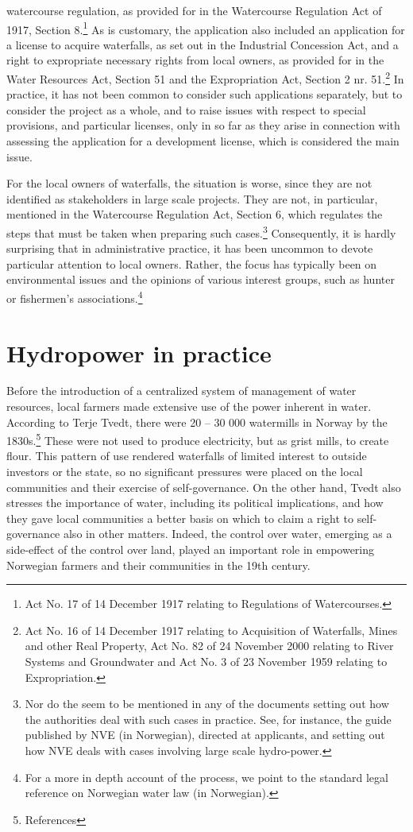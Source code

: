 watercourse regulation, as provided for in the Watercourse Regulation Act of 1917, Section 8.\footnote{Act No. 17 of 14 December 1917 relating to Regulations of Watercourses.} As is customary, the application also included an application for a license to acquire waterfalls, as set out in the Industrial Concession Act, and a right to expropriate necessary rights from local owners, as provided for in the Water Resources Act, Section 51 and the Expropriation Act, Section 2 nr. 51.\footnote{Act No. 16 of 14 December 1917 relating to Acquisition of Waterfalls, Mines and other Real Property, Act No. 82 of 24 November 2000 relating to River Systems and Groundwater and Act No. 3 of 23 November 1959 relating to Expropriation.} In practice, it has not been common to consider such applications separately, but to consider the project as a whole, and to raise issues with respect to special provisions, and particular licenses, only in so far as they arise in connection with assessing the application for a development license, which is considered the main issue.


For the local owners of waterfalls, the situation is worse, since they are not identified as stakeholders in large scale projects. They are not, in particular, mentioned in the Watercourse Regulation Act, Section 6, which regulates the steps that must be taken when preparing such cases.\footnote{Nor do the seem to be mentioned  in any of the documents setting out how the authorities deal with such cases in practice. See, for instance, the guide published by NVE \cite{rettleiar} (in Norwegian), directed at applicants, and setting out how NVE deals with cases involving large scale hydro-power.} Consequently, it is hardly surprising that in administrative practice, it has been uncommon to devote particular attention to local owners. Rather, the focus has typically been on environmental issues and the opinions of various interest groups, such as hunter or fishermen's associations.\footnote{For a more in depth account of the process, we point to the standard legal reference on Norwegian water law \cite{falk}(in Norwegian).}

\section{Hydropower in practice}

Before the introduction of a centralized system of management of water resources, local farmers made extensive use of the power inherent in water. According to Terje Tvedt, there were 20 -- 30 000 watermills in Norway by the 1830s.\footnote{References} These were not used to produce electricity, but as grist mills, to create flour. This pattern of use rendered waterfalls of limited interest to outside investors or the state, so no significant pressures were placed on the local communities and their exercise of self-governance. On the other hand, Tvedt also stresses the importance of water, including its political implications, and how they gave local communities a better basis on which to claim a right to self-governance also in other matters. Indeed, the control over water, emerging as a side-effect of the control over land, played an important role in empowering Norwegian farmers and their communities in the 19th century. 


